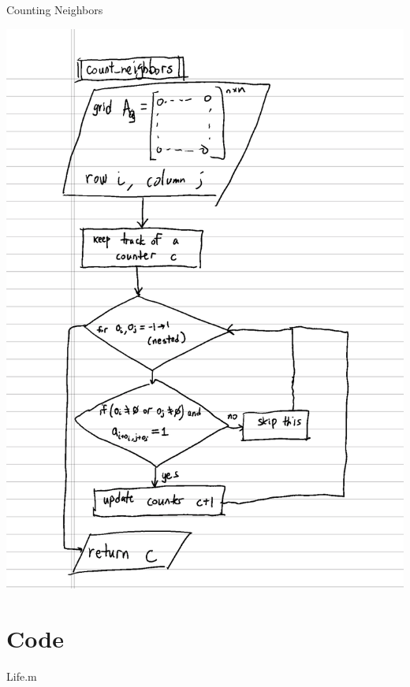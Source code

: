 \documentclass{article}
\begin{document}
\pagebreak
Counting Neighbors

\includegraphics[scale=0.25]{pseudocode2.png}
\pagebreak

\section{Code}

Life.m
\end{document}
